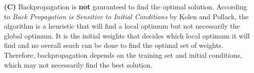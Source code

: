 \documentclass[12pt,twoside]{article}
\begin{document}
\textbf{(C)} Backpropagation is \textbf{not} gauranteed to find the optimal solution.  According to \textit{Back Propagation is Sensitive to Initial Conditions} by Kolen and Pollack, the algorithm is a heuristic that will find a local optimum but not necessarily the global optimum.  It is the initial weights that decides which local optimum it will find and no overall seach can be done to find the optimal set of weights.  Therefore, backpropagation depends on the training set and initial conditions, which may not necessarily find the best solution. 
\end{document}
